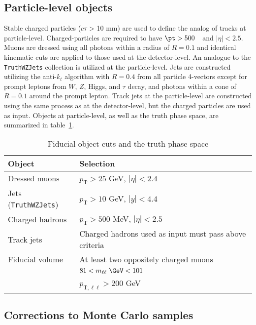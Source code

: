 \subsection{Particle-level objects}

Stable charged particles ($c\tau$ > 10 mm) are used to define the analog of tracks at particle-level. Charged-particles are required to have $\pt > 500$~\MeV~and $|\eta|<2.5$.
Muons are dressed using all photons within a radius of $R=0.1$ and identical kinematic cuts are applied to those used at the detector-level.
An analogue to the \texttt{TruthWZJets} collection is utilized at the particle-level. Jets are constructed utilizing the anti-$k_t$ algorithm with $R=0.4$ from all particle 4-vectors except for prompt leptons from $W$, $Z$, Higgs, and $\tau$ decay, and photons within a cone of $R=0.1$ around the prompt lepton.
Track jets at the particle-level are constructed using the same process as at the detector-level, but the charged particles are used as input.
Objects at particle-level, as well as the truth phase space, are summarized in table~\ref{tab:PLObjCuts}.

\begin{table}[h!]
    \centering
    \begin{tabular}{l|l}
    \hline
    \textbf{Object} & \textbf{Selection} \\ \hline
    Dressed muons & $p_\text{T} > 25$ GeV, $|\eta| < 2.4$ \\\hline
    Jets (\texttt{TruthWZJets}) & $p_\text{T} > 10$ GeV, $|y|<4.4$ \\\hline
    Charged hadrons & $p_\text{T}>500$ MeV, $|\eta|<2.5$  \\ \hline
    Track jets & Charged hadrons used as input must pass above criteria \\ \hline
    Fiducial volume & At least two oppositely charged muons \\
    & $81<m_{\ell\ell}~\GeV<101$ \\
    & $p_{\text{T},\ell\ell}>200$ GeV \\ \hline
    \end{tabular}
    \caption{Fiducial object cuts and the truth phase space}
    \label{tab:PLObjCuts}
\end{table}

\subsection{Corrections to Monte Carlo samples}
\label{subsec:MCCorr}
